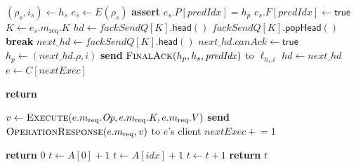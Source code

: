   \begin{algorithm}[!tb]
    \caption{Ellis\_CT Shard Leader: Request Execution}
    \label{ellis-ct-leader-commit-execute}
    \begin{algorithmic}[1]
        \State $(\rho_s,i_s)\gets h_s$
        \State $e_s\gets E(\rho_s)$
        \State \textbf{assert} $e_s.P[\mathit{predIdx}]=h_p$
        \State $e_s.F[\mathit{predIdx}]\gets\mathsf{true}$
        \State $K\gets e_s.m_{\mathrm{req}}.K$
        \State $hd\gets fackSendQ[K].\mathsf{head}()$
                \State $fackSendQ[K].\mathsf{popHead}()$
                    \State \textbf{break}
                \EndIf
                \State $next\_hd\gets fackSendQ[K].\mathsf{head}()$
                \State $next\_hd.\mathit{canAck}\gets\mathsf{true}$
                \State $h_p\gets(next\_hd.\rho,i)$
                    \State \textbf{send} $\textsc{FinalAck}(h_p, h_s, \mathit{predIdx})$
                    to $\ell_{h_s.i}$
                \EndFor
                \State $hd\gets next\_hd$
            \EndWhile
        \EndIf
        \State {}
      \EndProcedure
          \State $e\gets C[\mathit{nextExec}]$
  
            \State \textbf{return}
          \EndIf
  
          \State $v\gets
            \Call{Execute}{e.m_{\mathrm{req}}.\textit{Op},
                           e.m_{\mathrm{req}}.K,
                           e.m_{\mathrm{req}}.V}$
          \State \textbf{send}
            $\textsc{OperationResponse}(e.m_{\mathrm{req}},v)$
            to $e$'s client
          \State $\mathit{nextExec}\mathrel{+}=1$
        \EndWhile
      \EndProcedure

            \State \textbf{return} $0$
        \EndIf
        \State $t\gets A[0]+1$
            \State $t\gets A[idx]+1$
            \Else
            \State $t\gets t+1$
            \EndIf
        \EndFor
        \State \textbf{return} $t$
      \EndFunction
    \end{algorithmic}
  \end{algorithm}

